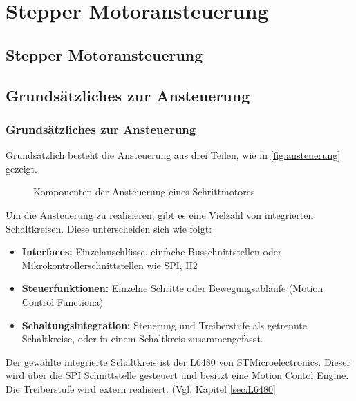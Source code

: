 \ifSTANDALONE
\section{Stepper Motoransteuerung}
\fi
\ifEMBED
\subsection{Stepper Motoransteuerung}
\fi

\ifEMBED
    \BLDCcollab
\fi
    \ifSTANDALONE
    \subsection{Grundsätzliches zur Ansteuerung}\label{subsec:Ansteuerung}
    \fi
    \ifEMBED
    \subsubsection{Grundsätzliches zur Ansteuerung}\label{subsec:Ansteuerung}
    \fi
    	Grundsätzlich besteht die Ansteuerung aus drei Teilen, wie in \autoref*{fig:ansteuerung} gezeigt. 
    	\begin{figure}[H]
    		\centering
    		\caption{Komponenten der Ansteuerung eines Schrittmotores}
    		\label{fig:ansteuerung}
    	\end{figure}
        Um die Ansteuerung zu realisieren, gibt es eine Vielzahl von integrierten Schaltkreisen. Diese unterscheiden sich wie folgt: 
        \begin{itemize}
        	\item \textbf{Interfaces:} Einzelanschlüsse, einfache Busschnittstellen oder Mikrokontrollerschnittstellen wie SPI, II2
        	\item \textbf{Steuerfunktionen:} Einzelne Schritte oder Bewegungsabläufe (Motion Control Functiona)
        	\item \textbf{Schaltungsintegration:} Steuerung und Treiberstufe als getrennte Schaltkreise, oder in einem Schaltkreis zusammengefasst. 
        \end{itemize}
        Der gewählte integrierte Schaltkreis ist der L6480 von STMicroelectronics. Dieser wird über die SPI Schnittstelle gesteuert und besitzt eine Motion Contol Engine. Die Treiberstufe wird extern realisiert. (Vgl. Kapitel \ref{sec:L6480} 
        
